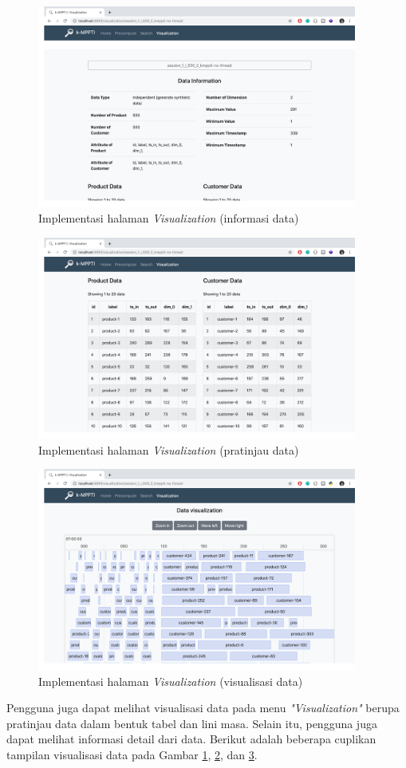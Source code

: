 \begin{figure}[H]
	\centering
	\includegraphics[width=10.5cm]{assets/img/bab4/data-info.png}
	\caption{Implementasi halaman \textit{Visualization} (informasi data)}
	\label{fig:visual-data-info}
\end{figure}

\begin{figure}[H]
	\centering
	\includegraphics[width=10.5cm]{assets/img/bab4/visual-table.png}
	\caption{Implementasi halaman \textit{Visualization} (pratinjau data)}
	\label{fig:visual-table}
\end{figure}

\begin{figure}[H]
	\centering
	\includegraphics[width=10.5cm]{assets/img/bab4/visual-timeline.png}
	\caption{Implementasi halaman \textit{Visualization} (visualisasi data)}
	\label{fig:visual-timeline}
\end{figure}

Pengguna juga dapat melihat visualisasi data pada menu \textit{"Visualization"} berupa pratinjau data dalam bentuk tabel dan lini masa. Selain itu, pengguna juga dapat melihat informasi detail dari data. Berikut adalah beberapa cuplikan tampilan visualisasi data pada Gambar \ref{fig:visual-data-info}, \ref{fig:visual-table}, dan \ref{fig:visual-timeline}.
